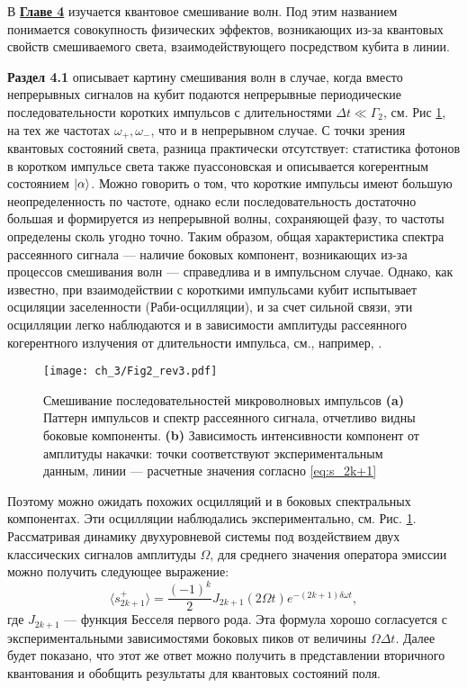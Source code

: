 В \underline{\textbf{Главе 4}} изучается квантовое смешивание волн. Под этим названием понимается совокупность  физических эффектов, возникающих из-за квантовых свойств смешиваемого света, взаимодействующего посредством кубита в линии. 

\textbf{Раздел 4.1} описывает картину смешивания волн в случае, когда вместо непрерывных сигналов на кубит подаются непрерывные периодические последовательности коротких импульсов с длительностями $\Delta t \ll \Gamma_2$, см. Рис \ref{fig: bessel}, на тех же частотах $\omega_+, \omega_-$, что и в непрерывном случае. С точки зрения квантовых состояний света, разница практически отсутствует: статистика фотонов в коротком импульсе света также пуассоновская и описывается когерентным состоянием $\ket{\alpha}$. Можно говорить о том, что короткие импульсы имеют большую неопределенность по частоте, однако если последовательность достаточно большая и формируется из непрерывной волны, сохраняющей фазу, то частоты определены сколь угодно точно. Таким образом, общая характеристика спектра рассеянного сигнала --- наличие боковых компонент, возникающих из-за процессов смешивания волн --- справедлива и в импульсном случае. Однако, как известно, при взаимодействии с короткими импульсами кубит испытывает осциляции заселенности (Раби-осцилляции), и за счет сильной связи, эти осцилляции легко наблюдаются и в зависимости амплитуды рассеянного когерентного излучения от длительности импульса, см., например, \cite{abdumalikov2011dynamics}.
\begin{figure}[htb]\center
	\texttt{[image: ch\_3/Fig2\_rev3.pdf]}	
	\caption{Смешивание последовательностей микроволновых импульсов  \textbf{(a)} Паттерн импульсов и спектр рассеянного сигнала, отчетливо видны боковые компоненты. \textbf{(b)} Зависимость интенсивности компонент от амплитуды накачки: точки соответствуют экспериментальным данным, линии --- расчетные значения согласно \eqref{eq:s_2k+1}}
	\label{fig: bessel}
\end{figure}
Поэтому можно ожидать похожих осцилляций и в боковых спектральных компонентах. Эти осцилляции наблюдались экспериментально, см. Рис. \ref{fig: bessel}. Рассматривая динамику двухуровневой системы под воздействием двух классических сигналов амплитуды $\Omega$, для среднего значения оператора эмиссии можно получить следующее выражение: 
\begin{equation}
\langle s^+_{2k+1}\rangle = \frac{(-1)^k}{2}J_{2k+1}(2\Omega t)e^{-(2k+1)\delta\omega t}, 
\label{eq:s_2k+1}
\end{equation}
где $J_{2k+1}$ --- функция Бесселя первого рода. Эта формула хорошо согласуется с экспериментальными зависимостями боковых пиков от величины $\Omega\Delta t$. Далее будет показано, что этот же ответ можно получить в представлении вторичного квантования и обобщить результаты для квантовых состояний поля. 

